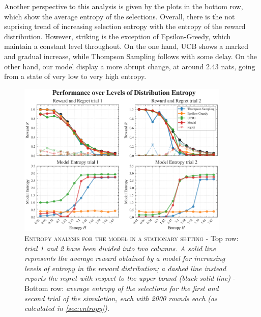 Another perspective to this analysis is given by the plots in the bottom row, which show the average entropy of the selections.
Overall, there is the not suprising trend of increasing selection entropy with the entropy of the reward distribution. However, striking is the exception of Epsilon-Greedy, which maintain a constant level throughout.
On the one hand, UCB shows a marked and gradual increase, while Thompson Sampling follows with some delay.
On the other hand, our model display a more abrupt change, at around 2.43 nats, going from a state of very low to very high entropy.


\begin{figure}[H]
    \centering
    \includegraphics[width=0.9\textwidth]{figures/entropy_performance_plot.png}
    \caption{\textsc{Entropy analysis for the model in a stationary setting} - Top row: \textit{trial 1 and 2 have been divided into two columns. A solid line represents the average reward obtained by a model for increasing levels of entropy in the reward distribution; a dashed line instead reports the regret with respect to the upper bound (black solid line) }
- Bottom row: \textit{average entropy of the selections for the first and second trial of the simulation, each with 2000 rounds each (as calculated in \ref{sec:entropy}).}}
\end{figure}\label{fig:entropy_distr}




